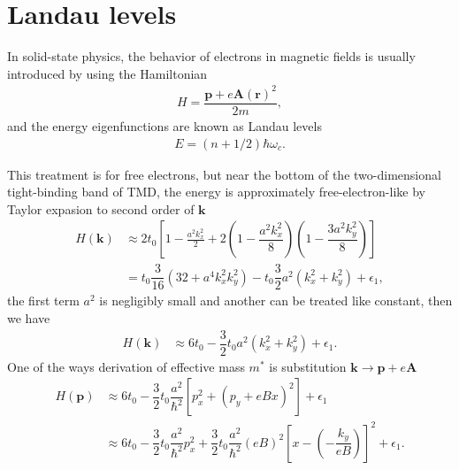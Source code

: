 \documentclass{report}
\newcommand{\f}[2]{\dfrac{#1}{#2}}
\begin{document}
\section{Landau levels}
In solid-state physics, the behavior of electrons in magnetic fields is usually introduced by using the Hamiltonian
\begin{gather}
	H = \f{\mathbf{p} + e \mathbf{A}(\mathbf{r})^{2}}{2m} ,
\end{gather}
and the energy eigenfunctions are known as Landau levels
\begin{gather}
	E = \left(n + 1/2\right) \hbar \omega_{c}.
\end{gather}

This treatment is for free electrons, \cite{10.1119/1.1615568} but near the bottom of the two-dimensional tight-binding band of TMD, the energy is approximately free-electron-like by Taylor expasion to second order of $\mathbf{k}$
\begin{equation}
	\begin{aligned}
		H(\mathbf{k})
		 & \approx 2 t_{0} \left[1 - \frac{a^{2} k_{x}^{2}}{2} + 2\left(1 - \f{a^{2} k_{x}^{2}}{8}\right)\left(1 - \f{3a^{2} k_{y}^{2}}{8}\right)\right] \\
		 & = t_{0} \f{3}{16} \left(32 + a^{4} k_{x}^{2} k_{y}^{2}\right) - t_{0} \f{3}{2} a^{2}\left(k_{x}^{2} + k_{y}^{2}\right) + \epsilon_{1} ,
	\end{aligned}
\end{equation}
the first term $a^{2}$ is negligibly small and another can be treated like constant, then we have
\begin{equation}
	\begin{aligned}
		H(\mathbf{k})
		 & \approx 6 t_{0} - \f{3}{2} t_{0} a^{2} (k_{x}^{2} + k_{y}^{2}) + \epsilon_{1}.
	\end{aligned}
\end{equation}
One of the ways derivation of effective mass $m^{*}$ is substitution $\mathbf{k} \rightarrow \mathbf{p} + e \mathbf{A}$
\begin{equation}
	\begin{aligned}
		H(\mathbf{p})
		 & \approx 6 t_{0} - \f{3}{2} t_{0} \f{a^{2}}{\hbar^{2}} \left[ p_{x}^{2} + \left(p_{y} + e B x\right)^{2}\right] + \epsilon_{1}                                                       \\
		 & \approx 6 t_{0} - \f{3}{2} t_{0} \f{a^{2}}{\hbar^{2}} p_{x}^{2} + \f{3}{2} t_{0} \f{a^{2}}{\hbar^{2}} (e B)^{2} \left[ x - \left(- \f{k_{y}}{eB}\right) \right]^{2} + \epsilon_{1}.
	\end{aligned}
\end{equation}
\end{document}
